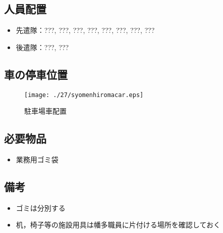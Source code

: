 \subsection{人員配置}
\begin{itemize}
\item 先遣隊：???, ???, ???, ???, ???, ???, ???, ???
\item 後遣隊：???, ???
\end{itemize}


\subsection{車の停車位置}
\begin{figure}[h]
 \begin{center}
  \texttt{[image: ./27/syomenhiromacar.eps]}
 \end{center}
 \caption{駐車場車配置}
\end{figure}

\subsection{必要物品}
\begin{itemize}
\item 業務用ゴミ袋
\end{itemize}


\subsection{備考}
\begin{itemize}
\item ゴミは分別する
\item 机，椅子等の施設用具は幡多職員に片付ける場所を確認しておく
\end{itemize}


%

